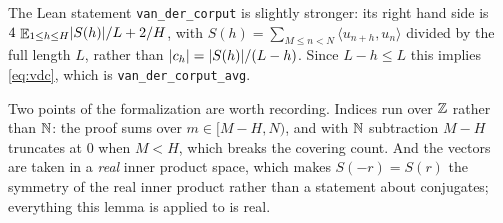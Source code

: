 \begin{remark}
  \leanok
  The Lean statement \texttt{van\_der\_corput} is slightly stronger: its right hand side is
  $4\, \mathop{\mathbb{E}}_{1 \leq h \leq H} \lvert S(h) \rvert/L + 2/H$, with $S(h) = \sum_{M \leq n<N} \langle u_{n+h}, u_n\rangle$
  divided by the full length $L$, rather than $\lvert c_h \rvert = \lvert S(h) \rvert/(L-h)$.  Since $L-h \leq L$ this
  implies \eqref{eq:vdc}, which is \texttt{van\_der\_corput\_avg}.

  Two points of the formalization are worth recording.  Indices run over $\mathbb{Z}$ rather than
  $\mathbb{N}$: the proof sums over $m \in [M-H,N)$, and with $\mathbb{N}$ subtraction $M-H$ truncates at $0$
  when $M<H$, which breaks the covering count.  And the vectors are taken in a \emph{real}
  inner product space, which makes $S(-r)=S(r)$ the symmetry of the real inner product rather
  than a statement about conjugates; everything this lemma is applied to is real.
\end{remark}
